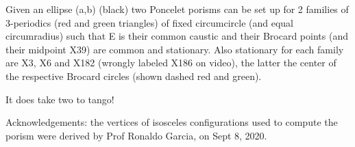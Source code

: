 Given an ellipse (a,b) (black) two Poncelet porisms can be set up for 2 families of 3-periodics (red and green triangles) of fixed circumcircle (and equal circumradius) such that E is their common caustic and their Brocard points (and their midpoint X39) are common and stationary. Also stationary for each family are X3, X6 and X182 (wrongly labeled X186 on video), the latter the center of the respective Brocard circles (shown dashed red and green).

It does take two to tango!

Acknowledgements: the vertices of isosceles configurations used to compute the porism were derived by Prof Ronaldo Garcia, on Sept 8, 2020.